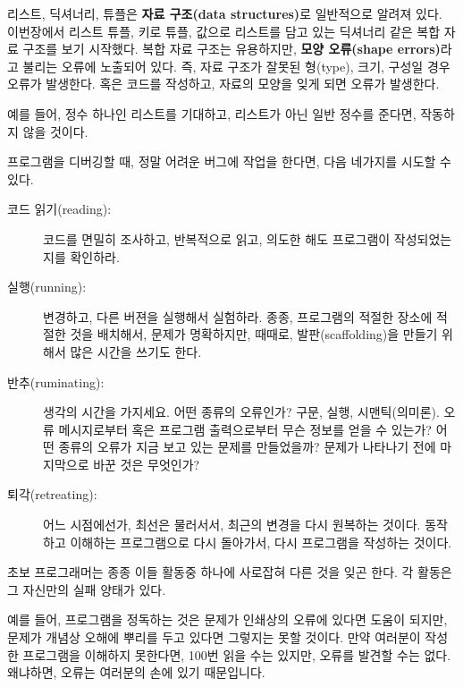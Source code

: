 리스트, 딕셔너리, 튜플은 {\bf 자료 구조(data structures)}로 일반적으로 알려져 있다.
이번장에서 리스트 튜플, 키로 튜플, 값으로 리스트를 담고 있는 딕셔너리 같은 복합 자료 구조를 보기 시작했다.
복합 자료 구조는 유용하지만,  {\bf 모양 오류(shape errors)}라고 불리는 오류에 노출되어 있다.
즉, 자료 구조가 잘못된 형(type), 크기, 구성일 경우 오류가 발생한다. 
혹은 코드를 작성하고, 자료의 모양을 잊게 되면 오류가 발생한다.

예를 들어, 정수 하나인 리스트를 기대하고, 리스트가 아닌 일반 정수를 준다면, 작동하지 않을 것이다.

프로그램을 디버깅할 때, 정말 어려운 버그에 작업을 한다면, 다음 네가지를 시도할 수 있다.

\begin{description}

\item[코드 읽기(reading):] 
코드를 면밀히 조사하고, 반복적으로 읽고, 의도한 해도 프로그램이 작성되었는지를 확인하라.

\item[실행(running):] 변경하고, 다른 버젼을 실행해서 실험하라. 종종, 프로그램의 적절한 장소에 적절한 것을 배치해서,
문제가 명확하지만, 때때로, 발판(scaffolding)을 만들기 위해서 많은 시간을 쓰기도 한다.

\item[반추(ruminating):] 
생각의 시간을 가지세요. 어떤 종류의 오류인가? 구문, 실행, 시맨틱(의미론). 
오류 메시지로부터 혹은 프로그램 출력으로부터 무슨 정보를 얻을 수 있는가?
어떤 종류의 오류가 지금 보고 있는 문제를 만들었을까? 문제가 나타나기 전에 마지막으로 바꾼 것은 무엇인가?

\item[퇴각(retreating):]
어느 시점에선가, 최선은 물러서서, 최근의 변경을 다시 원복하는 것이다. 
동작하고 이해하는 프로그램으로 다시 돌아가서, 다시 프로그램을 작성하는 것이다.
\end{description}

초보 프로그래머는 종종 이들 활동중 하나에 사로잡혀 다른 것을 잊곤 한다. 각 활동은 그 자신만의 실패 양태가 있다.


예를 들어, 프로그램을 정독하는 것은 문제가 인쇄상의 오류에 있다면 도움이 되지만, 문제가 개념상 오해에 뿌리를 두고 있다면
그렇지는 못할 것이다. 만약 여러분이 작성한 프로그램을 이해하지 못한다면, 100번 읽을 수는 있지만, 오류를 발견할 수는 없다.
왜냐하면, 오류는 여러분의 손에 있기 때문입니다.


